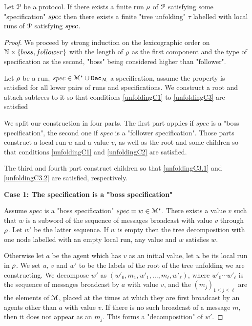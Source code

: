 \begin{lemma}
	\label{lem:run-to-tree}
	Let $\mathcal{P}$ be a protocol.
	If there exists a finite run $\rho$ of $\mathcal{P}$ satisfying some "specification" $spec$ then there exists a finite "tree unfolding" $\tau$ labelled with local runs of $\mathcal{P}$ satisfying $spec$.
\end{lemma}

\ifproofs
\begin{proof}
	
	We proceed by strong induction on the lexicographic order on $\mathbb{N} \times \{boss, follower\}$ with the length of $\rho$ as the first component and the type of specification as the second, "boss" being considered higher than "follower". 
	
	Let $\rho$ be a run, $spec \in \mathcal{M}^* \cup \mathtt{Dec}_{\mathcal{M}}$ a specification, assume the property is satisfied for all lower pairs of runs and specifications. We construct a root and attach subtrees to it so that conditions \ref{unfoldingC1} to \ref{unfoldingC3} are satisfied 
	
	We split our construction in four parts. The first part applies if $spec$ is a "boss specification", the second one if $spec$ is a "follower specification". 
	Those parts construct a local run $u$ and a value $v$, as well as the root and some children so that conditions \ref{unfoldingC1} and \ref{unfoldingC2} are satisfied.
	
	The third and fourth part construct children so that \ref{unfoldingC3.1} and \ref{unfoldingC3.2} are satisfied, respectively.
	
	\textbf{Case 1: The specification is a "boss specification"}
	
	Assume $spec$ is a "boss specification" $spec = w \in \mathcal{M}^*$.
	There exists a value $v$ such that $w$ is a subword of the sequence of messages broadcast with value $v$ through $\rho$. Let $w'$ be the latter sequence.
	If $w$ is empty then the tree decomposition with one node labelled with an empty local run, any value and $w$ satisfies $w$.	
	
	Otherwise let $a$ be the agent which has $v$ as an initial value, let $u$ be its local run in $\rho$. We set $u$, $v$ and $w'$ to be the labels of the root of the tree unfolding we are constructing.
	We decompose $w'$ as $(w'_0, m_1, w'_1, \ldots, m_\ell, w'_\ell)$, where $w'_0\cdots w'_\ell$ is the sequence of messages broadcast by $a$ with value $v$, and the $(m_j)_{1\leq j\leq \ell}$ are the elements of $\mathcal{M}$, placed at the times at which they are first broadcast by an agents other than $a$ with value $v$. If there is no such broadcast of a message $m$, then it does not appear as an $m_j$. This forms a "decomposition" of $w'$.
		

\end{proof}
